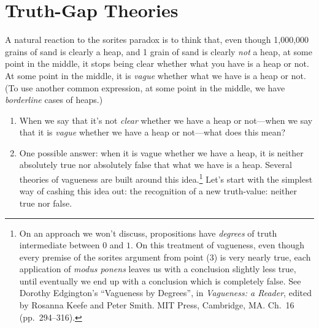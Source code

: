 \documentclass[landscape, two column, full page,reqno]{article}
\newcommand{\qe}{\begin{enumerate}[align=left,style=nextline,leftmargin=17pt,labelsep=5pt,font=\normalfont]}
\newcommand{\e}{\emph}
\newcommand{\ze}{\end{enumerate}}
\newcommand{\p}{\item}
\begin{document}
\section{Truth-Gap Theories}
\p A natural reaction to the sorites paradox is to think that, even though 1,000,000 grains of sand is clearly a heap, and 1 grain of sand is clearly \e{not} a heap, at some point in the middle, it stops being clear whether what you have is a  heap or not.  At some point in the middle, it is \e{vague} whether what we have is a heap or not.  (To use another common expression, at some point in the middle, we have \e{borderline} cases of heaps.)
	\qe
	\p When we say that it's not \e{clear} whether we have a heap or not---when we say that it is \e{vague} whether we have a heap or not---what does this mean?
	\p One possible answer: when it is vague whether we have a heap, it is neither absolutely true nor absolutely false that what we have is a heap.  Several theories of vagueness are built around this idea.\footnote{ On an approach we won't discuss, propositions have \e{degrees} of truth intermediate between $0$ and $1$.  On this treatment of vagueness, even though every premise of the sorites argument from point (3) is very nearly true, each application of \e{modus ponens} leaves us with a conclusion slightly less true, until eventually we end up with a conclusion which is completely false.  See Dorothy Edgington's ``{Vagueness by Degrees}'', in \emph{Vagueness: a Reader}, edited by Rosanna Keefe and Peter Smith.  MIT Press, Cambridge, MA.  Ch.~16 (pp.~294--316).}  Let's start with the simplest way of cashing this idea out: the recognition of a new truth-value: neither true nor false.
	\ze 
\end{document}
